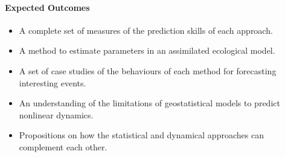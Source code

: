 \paragraph{Expected Outcomes}

\begin{itemize}
\item A complete set of measures of the prediction skills of each approach.
\item A method to estimate parameters in an assimilated ecological model.
\item A set of case studies of the behaviours of each method for forecasting interesting events.
\item An understanding of the limitations of geostatistical models to predict nonlinear dynamics. 
\item Propositions on how the statistical and dynamical approaches can complement each other.
\end{itemize}
